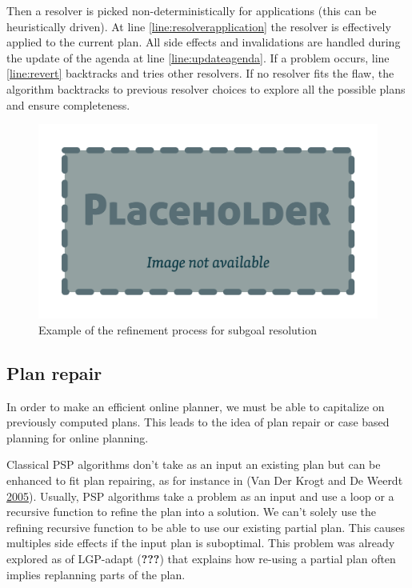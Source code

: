 \documentclass[11pt,a4paper,twoside,openright,titlepage,numbers=noenddot,headinclude,cleardoublepage=empty,openany]{scrreprt}
\theoremstyle{plain}
\theoremstyle{definition}
\theoremstyle{remark}
\begin{document}
Then a resolver is picked non-deterministically for applications (this
can be heuristically driven). At line \ref{line:resolverapplication} the
resolver is effectively applied to the current plan. All side effects
and invalidations are handled during the update of the agenda at
line \ref{line:updateagenda}. If a problem occurs,
line \ref{line:revert} backtracks and tries other resolvers. If no
resolver fits the flaw, the algorithm backtracks to previous resolver
choices to explore all the possible plans and ensure completeness.

\begin{figure}
\hypertarget{fig:refinement}{%
\centering
\includegraphics{./tex2pdf.-0b80fea6fd6da7f9/85c5abcb21612ede4db12ac6fcfd32ed24ed57eb.pdf}
\caption{Example of the refinement process for subgoal
resolution}\label{fig:refinement}
}
\end{figure}

\hypertarget{plan-repair}{%
\subsection{Plan repair}\label{plan-repair}}

In order to make an efficient online planner, we must be able to
capitalize on previously computed plans. This leads to the idea of plan
repair or case based planning for online planning.

Classical PSP algorithms don't take as an input an existing plan but can
be enhanced to fit plan repairing, as for instance in (Van Der Krogt and
De Weerdt \protect\hyperlink{ref-vanderkrogt_plan_2005}{2005}). Usually,
PSP algorithms take a problem as an input and use a loop or a recursive
function to refine the plan into a solution. We can't solely use the
refining recursive function to be able to use our existing partial plan.
This causes multiples side effects if the input plan is suboptimal. This
problem was already explored as of LGP-adapt ({\textbf{???}}) that
explains how re-using a partial plan often implies replanning parts of
the plan.
\end{document}
